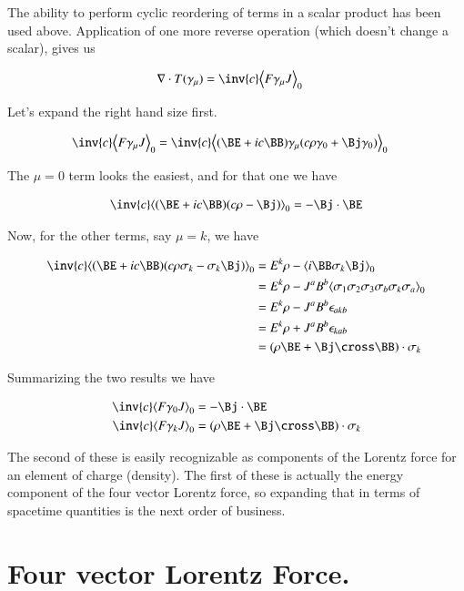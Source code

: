 \documentclass{article}
\begin{document}
The ability to perform cyclic reordering of terms in a scalar product has been used above.  Application of one more
reverse operation (which doesn't change a scalar), gives us

\begin{align}
\grad \cdot T(\gamma_\mu) &= \inv{c} \gpgradezero{ F \gamma_\mu J } 
\end{align}

Let's expand the right hand size first.

\begin{align*}
\inv{c} \gpgradezero{ F \gamma_\mu J } &= \inv{c} \gpgradezero{ (\BE + i c \BB) \gamma_\mu (c \rho \gamma_0 + \Bj \gamma_0) } 
\end{align*}

The $\mu = 0$ term looks the easiest, and for that one we have

\begin{align*}
\inv{c} \gpgradezero{ (\BE + i c \BB) (c \rho - \Bj) }  = -\Bj \cdot \BE
\end{align*}

Now, for the other terms, say $\mu = k$, we have

\begin{align*}
\inv{c} \gpgradezero{ (\BE + i c \BB) (c \rho \sigma_k - \sigma_k \Bj ) } 
&= E^k \rho - \gpgradezero{ i \BB \sigma_k \Bj }  \\
&= E^k \rho - J^a B^b \gpgradezero{ \sigma_1 \sigma_2 \sigma_3 \sigma_b \sigma_k \sigma_a }  \\
&= E^k \rho - J^a B^b \epsilon_{a k b} \\
&= E^k \rho + J^a B^b \epsilon_{k a b} \\
&= (\rho \BE + \Bj \cross \BB) \cdot \sigma_k
\end{align*}

Summarizing the two results we have

\begin{align}
\inv{c} \gpgradezero{ F \gamma_0 J } &= -\Bj \cdot \BE \\
\inv{c} \gpgradezero{ F \gamma_k J } &= (\rho \BE + \Bj \cross \BB) \cdot \sigma_k
\end{align}

The second of these is easily recognizable as components of the Lorentz force for an element of charge (density).  The first
of these is actually the energy component of the four vector Lorentz force, so expanding that in terms of spacetime quantities
is the next order of business.

\section{ Four vector Lorentz Force. }
\end{document}
